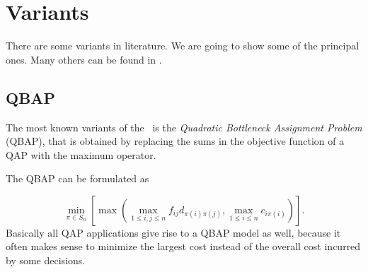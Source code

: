 \begin{comment}
The element $f_{ik}d_{jl}$ lies in the $((j-1)n+i)$th row and $((l-1)n+k)$th column of matrix $\bm D \otimes \bm F$. Therefore, we can arrange the $n^4$ cost coefficients $d_{ijkl}$ in a new way so that the element $d_{ijkl}$ lies in row $(j-1)n+i$ and column $(l-1)n+k$ of an $n^2\times n^2$ matrix $\bm M$.
The general QAP can be written as

\begin{tcolorbox}[title=Convex formulation]
	\begin{equation}
\begin{split}	
&\min{\left[\bm x\trasp \bm M \bm x\right]} \\
&\text{ s.t.} \quad   \bm X \text{ is a permutation matrix}\\
&\phantom{\text{ s.t.}} \quad \bm x = \vettore(\bm X)
\end{split}
	\end{equation}
\end{tcolorbox}

We can assume that $\bm M$ is symmetric and positive definite/negative, so we can write a \QAP \ as a quadratic convex program or quadratic concave program.


\end{comment}

\section{Variants}
\label{sec:Variants}
There are some variants in literature. We are going to show some of the principal ones. Many others can be found in \cite[Ch. 9]{Burkard2012}.
\subsection{QBAP}
The most known variants of the \QAP \ is the \textit{Quadratic Bottleneck Assignment Problem} (QBAP), that is obtained by replacing the sums in the objective function of a QAP with the maximum operator.

The QBAP can be formulated as

\begin{equation}
\min_{\pi \in S_n} {\left[\max{\left(\max_{1\le i,j \le n} {f_{ij}d_{\pi{(i)}\pi{(j)}}}, \max_{1\le i\le n}{c_{i\pi(i)}}\right)}\right]}. 
\end{equation}
Basically all QAP applications give rise to a QBAP model as well, because it often makes sense to minimize the largest cost instead of the overall cost incurred by some decisions.


